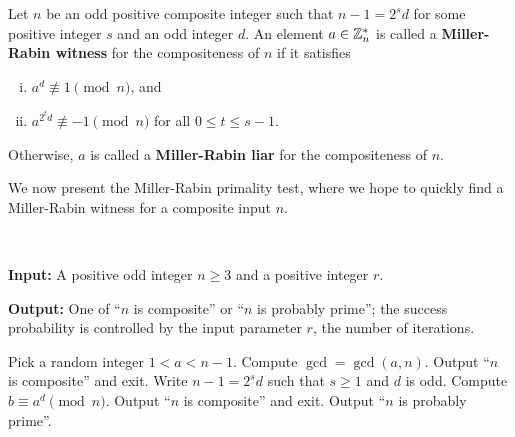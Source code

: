 \begin{defn}
Let $n$ be an odd positive composite integer such that $n-1=2^sd$ for some positive integer $s$ and an odd integer $d$. An element $a\in \mathbb{Z}_n^*$ is called a {\bf Miller-Rabin witness} for the compositeness of $n$ if it satisfies
\begin{enumerate}[(i)]
    \item $a^d \not\equiv 1 \pmod n$, and 
    \item $a^{2^td} \not\equiv -1 \pmod n$ for all $0 \leq t \leq s-1$. 
\end{enumerate}
Otherwise, $a$ is called a {\bf Miller-Rabin liar} for the compositeness of $n$. 
\end{defn}

We now present the Miller-Rabin primality test, where we hope to quickly find a Miller-Rabin 
witness for a composite input $n$. 

\begin{algo}~

{\bf Input:} A positive odd integer $n \geq 3$ and a positive integer $r$. 

{\bf Output:} One of ``$n$ is composite'' or ``$n$ is probably prime''; the success probability is controlled by the input parameter $r$, the number of iterations. \vspace{0.5em}

\begin{algorithmic}[1]
 
    \State Pick a random integer $1 < a < n-1$. 
    \State Compute $\gcd = \gcd(a, n)$. 
        \State Output ``$n$ is composite'' and exit.
    \Else
        \State Write $n - 1 = 2^s d$ such that $s \geq 1$ and $d$ is odd.
        \State Compute $b \equiv a^d \pmod n$. 
            \State Output ``$n$ is composite'' and exit. 
        \EndIf 
    \EndIf
\EndFor 
\State Output ``$n$ is probably prime''. 
\end{algorithmic}
\end{algo}